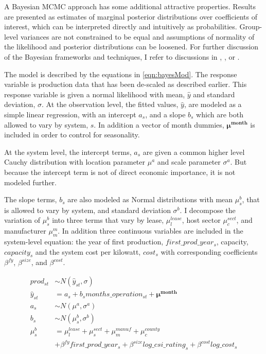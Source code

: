 \documentclass[a4paper]{article}
\begin{document}
A Bayesian MCMC approach has some additional attractive properties. Results are presented as estimates of marginal posterior distributions over coefficients of interest, which can be interpreted directly and intuitively as probabilities. Group-level variances are not constrained to be equal and assumptions of normality of the likelihood and posterior distributions can be loosened. For further discussion of the Bayesian frameworks and techniques, I refer to discussions in \citet{gelman_bayesian_2013}, \citet{kruschke_doing_2014}, or \citet{mcelreath_statistical_2015}.

The model is described by the equations in \ref{eqn:bayesMod}. The response variable is production data that has been de-scaled as described earlier. This response variable is given a normal likelihood with mean, $\hat{y}$ and standard deviation, $\sigma$. At the observation level, the fitted values, $\hat{y}$, are modeled as a simple linear regression, with an intercept $a_s$, and a slope $b_s$ which are both allowed to vary by system, $s$. In addition a vector of month dummies, $\mathbf{\mu^{month}}$ is included in order to control for seasonality.

At the system level, the intercept terms, $a_s$ are given a common higher level Cauchy distribution with location parameter $\mu^a$ and scale parameter $\sigma^a$. But because the intercept term is not of direct economic importance, it is not modeled further.

The slope terms, $b_s$ are also modeled as Normal distributions with mean $\mu^{b}_s$, that is allowed to vary by system, and standard deviation $\sigma^{b}$. I decompose the variation of $\mu^{b}_s$ into three terms that vary by lease, $\mu^{lease}_l$, host sector $\mu^{sect}_c$, and manufacturer $\mu^m_m$. In addition three continuous variables are included in the system-level equation: the year of first production, $first\_prod\_year_s$, capacity, $capacity_s$ and the system cost per kilowatt, $cost_s$ with corresponding coefficients $\beta^{fy}$, $\beta^{size}$, and $\beta^{cost}$.

\begin{equation}
\begin{aligned}
prod_{st} &\sim N(\hat{y}_{st}, \sigma)\\ %
\hat{y}_{st} &= a_s + b_s months\_operation_{st} + \mathbf{\mu^{month}}\\
a_s &\sim N(\mu^a, \sigma^a)  \label{eqn:bayesMod} \\
b_s &\sim N(\mu_s^b, \sigma^b) \\
\mu_{s}^{b} & = \mu^{lease}_l + \mu^{sect}_s + \mu^{manuf}_m + \mu^{county}_c  \\
& +\beta^{fy} first\_prod\_year_s + \beta^{size} log\_csi\_rating_s + \beta^{cost} log\_cost_s
\end{aligned}
\end{equation}
\end{document}
